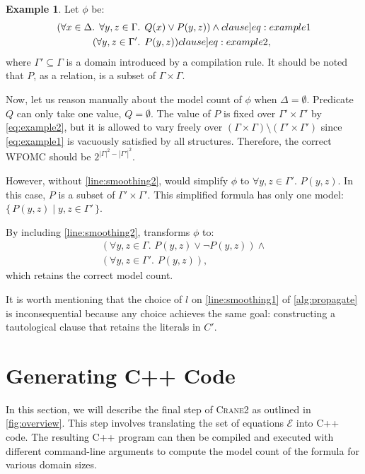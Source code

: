 \documentclass[letterpaper]{article} %
\theoremstyle{remark}
\theoremstyle{definition}
\newtheorem{example}{Example}
\newcommand{\Cranetwo}{\textsc{Crane2}}
\begin{document}
\begin{example}\label{example:basecasesmoothing}
  Let $\phi$ be:
  \begin{align}
    (\forall x \in \Delta\text{. }\forall y, z \in \Gamma&\text{. }Q(x) \lor P(y, z))\land{}\label[clause]{eq:example1}\\
    (\forall y, z \in \Gamma'&\text{. }P(y, z))\label[clause]{eq:example2},
  \end{align}
  where $\Gamma' \subseteq \Gamma$ is a domain introduced by a compilation rule.
  It should be noted that $P$, as a relation, is a subset of
  $\Gamma \times \Gamma$.

  Now, let us reason manually about the model count of $\phi$ when
  $\Delta = \emptyset$. Predicate $Q$ can only take one value, $Q = \emptyset$.
  The value of $P$ is fixed over $\Gamma' \times \Gamma'$ by \cref{eq:example2},
  but it is allowed to vary freely over
  $(\Gamma \times \Gamma) \setminus (\Gamma' \times \Gamma')$ since
  \cref{eq:example1} is vacuously satisfied by all structures. Therefore, the
  correct WFOMC should be $2^{|\Gamma|^2 - |\Gamma'|^2}$.

  However, without \cref{line:smoothing2}, \Propagate would simplify $\phi$ to
  $\forall y, z \in \Gamma'\text{. }P(y, z)$. In this case, $P$ is a subset of
  $\Gamma' \times \Gamma'$. This simplified formula has only one model:
  $\{\, P(y, z) \mid y, z \in \Gamma' \,\}$.

  By including \cref{line:smoothing2}, \Propagate transforms $\phi$ to:
  \begin{gather*}
    (\forall y, z \in \Gamma\text{. }P(y, z) \lor \neg P(y, z))\land{}\\
    (\forall y, z \in \Gamma'\text{. }P(y, z)),
  \end{gather*}
  which retains the correct model count.
\end{example}

It is worth mentioning that the choice of $l$ on \cref{line:smoothing1} of
\cref{alg:propagate} is inconsequential because any choice achieves the same
goal: constructing a tautological clause that retains the literals in $C'$.

\section{Generating C++ Code}\label{sec:cpp}

In this section, we will describe the final step of \Cranetwo{} as outlined in
\cref{fig:overview}. This step involves translating the set of equations
$\mathcal{E}$ into C++ code. The resulting C++ program can then be compiled and
executed with different command-line arguments to compute the model count of the
formula for various domain sizes.
\end{document}
